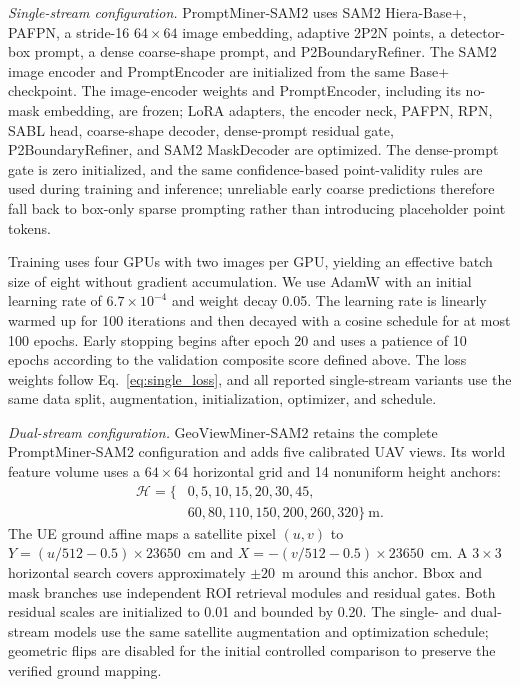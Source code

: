 \documentclass[letterpaper,journal]{IEEEtran}
\begin{document}
\noindent\textit{Single-stream configuration.}
PromptMiner-SAM2 uses SAM2 Hiera-Base+, PAFPN, a stride-16 $64\times64$ image embedding, adaptive 2P2N points, a detector-box prompt, a dense coarse-shape prompt, and P2BoundaryRefiner. The SAM2 image encoder and PromptEncoder are initialized from the same Base+ checkpoint. The image-encoder weights and PromptEncoder, including its no-mask embedding, are frozen; LoRA adapters, the encoder neck, PAFPN, RPN, SABL head, coarse-shape decoder, dense-prompt residual gate, P2BoundaryRefiner, and SAM2 MaskDecoder are optimized. The dense-prompt gate is zero initialized, and the same confidence-based point-validity rules are used during training and inference; unreliable early coarse predictions therefore fall back to box-only sparse prompting rather than introducing placeholder point tokens.

Training uses four GPUs with two images per GPU, yielding an effective batch size of eight without gradient accumulation. We use AdamW with an initial learning rate of $6.7\times10^{-4}$ and weight decay 0.05. The learning rate is linearly warmed up for 100 iterations and then decayed with a cosine schedule for at most 100 epochs. Early stopping begins after epoch 20 and uses a patience of 10 epochs according to the validation composite score defined above. The loss weights follow Eq.~\eqref{eq:single_loss}, and all reported single-stream variants use the same data split, augmentation, initialization, optimizer, and schedule.

\noindent\textit{Dual-stream configuration.}
GeoViewMiner-SAM2 retains the complete PromptMiner-SAM2 configuration and adds five calibrated UAV views. Its world feature volume uses a $64\times64$ horizontal grid and 14 nonuniform height anchors:
\begin{equation}
\begin{split}
\mathcal{H}=\{&0,5,10,15,20,30,45,\\
&60,80,110,150,200,260,320\}\ \text{m}.
\end{split}
\end{equation}
The UE ground affine maps a satellite pixel $(u,v)$ to $Y=(u/512-0.5)\times23650$~cm and $X=-(v/512-0.5)\times23650$~cm. A $3\times3$ horizontal search covers approximately $\pm20$~m around this anchor. Bbox and mask branches use independent ROI retrieval modules and residual gates. Both residual scales are initialized to 0.01 and bounded by 0.20. The single- and dual-stream models use the same satellite augmentation and optimization schedule; geometric flips are disabled for the initial controlled comparison to preserve the verified ground mapping.
\end{document}
